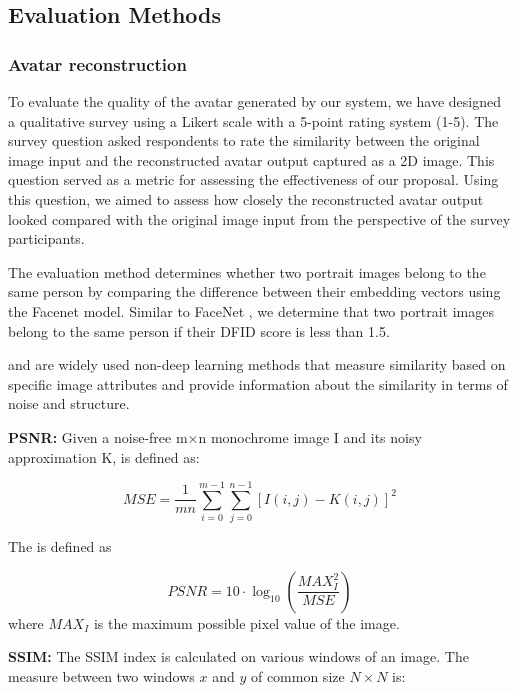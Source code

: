 \subsection{Evaluation Methods}
\subsubsection{Avatar reconstruction}
\label{sec:result/avatar-reconstruction}
To evaluate the quality of the avatar generated by our system, we have designed a qualitative survey using a Likert scale with a 5-point rating system (1-5). The survey question asked respondents to rate the similarity between the original image input and the reconstructed avatar output captured as a 2D image. This question served as a metric for assessing the effectiveness of our proposal. Using this question, we aimed to assess how closely the reconstructed avatar output looked compared with the original image input from the perspective of the survey participants.

The  \cite{zhuangMoFaNeRFMorphableFacial2022} evaluation method determines whether two portrait images belong to the same person by comparing the difference between their embedding vectors using the Facenet model. Similar to FaceNet \cite{schroffFaceNetUnifiedEmbedding2015}, we determine that two portrait images belong to the same person if their DFID score is less than 1.5.

 and  are widely used non-deep learning methods that measure similarity based on specific image attributes and provide information about the similarity in terms of noise and structure.

\textbf{PSNR:} Given a noise-free m×n monochrome image I and its noisy approximation K,  is defined as:

\begin{equation}
    MSE = \frac{1}{mn}\sum_{i=0}^{m-1}\sum_{j=0}^{n-1}[I(i,j)-K(i,j)]^2
\end{equation}

The  is defined as

\begin{equation}
    PSNR = 10\cdot\log_{10}\left(\frac{MAX_I^2}{MSE}\right)
\end{equation}
where $MAX_{I}$ is the maximum possible pixel value of the image.

\textbf{SSIM:} The SSIM index is calculated on various windows of an image. The measure between two windows $x$ and $y$ of common size $N \times N$ is:

